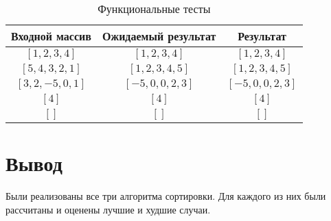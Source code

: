 \begin{table}[h]
	\begin{center}
		\caption{\label{tbl:functional_test} Функциональные тесты}
		\begin{tabular}{|c|c|c|}
			\hline
			Входной массив & Ожидаемый результат & Результат \\ 
			\hline
			$[1,2,3,4]$ & $[1,2,3,4]$  & $[1,2,3,4]$\\
			$[5,4,3,2,1]$  & $[1,2,3,4,5]$ & $[1,2,3,4,5]$\\
			$[3,2,-5,0,1]$  & $[-5,0,0,2,3]$  & $[-5,0,0,2,3]$\\
			$[4]$  & $[4]$  & $[4]$\\
			$[]$  & $[]$  & $[]$\\
			\hline
		\end{tabular}
	\end{center}
\end{table}


\section*{Вывод}

Были реализованы все три алгоритма сортировки. Для каждого из них были рассчитаны и оценены лучшие и худшие случаи.
